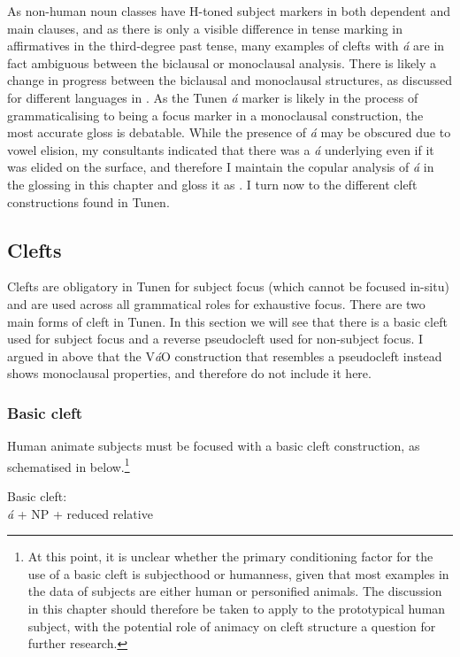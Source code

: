 \documentclass[output=paper,colorlinks,citecolor=brown
]{langscibook}
\begin{document}
As non-human noun classes have H-toned subject markers in both dependent and main clauses, and as there is only a visible difference in tense marking in affirmatives in the third-degree past tense, many examples of clefts with \textit{á} are in fact ambiguous between the biclausal or monoclausal analysis. There is likely a change in progress between the biclausal and monoclausal structures, as discussed for different languages in \citet{HarrisCampbell1995a}. As the Tunen \textit{á} marker is likely in the process of grammaticalising to being a focus marker in a monoclausal construction, the most accurate gloss is debatable. While the presence of \textit{á} may be obscured due to vowel elision, my consultants indicated that there was a \textit{á} underlying even if it was elided on the surface, and therefore I maintain the copular analysis of \textit{á} in the glossing in this chapter and gloss it as \COP{}. I turn now to the different cleft constructions found in Tunen.

\subsection{Clefts}

Clefts are obligatory in Tunen for subject focus (which cannot be focused in-situ) and are used across all grammatical roles for exhaustive focus. There are two main forms of cleft in Tunen. In this section we will see that there is a basic cleft used for subject focus and a reverse pseudocleft used for non-subject focus. I argued in  above that the V\textit{á}O construction that resembles a pseudocleft instead shows monoclausal properties, and therefore do not include it here.

\subsubsection{Basic cleft}
Human animate subjects must be focused with a basic cleft construction, as schematised in  below.\footnote{At this point, it is unclear whether the primary conditioning factor for the use of a basic cleft is subjecthood or humanness, given that most examples in the data of subjects are either human or personified animals. The discussion in this chapter should therefore be taken to apply to the prototypical human subject, with the potential role of animacy on cleft structure a question for further research.\label{footnote19}}

\ea \label{subjcleft}
Basic cleft: \\ \textit{á} + NP\textsubscript{\FOC{}} + reduced relative
\z
\end{document}
